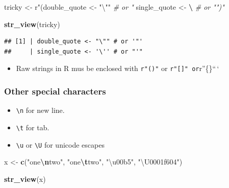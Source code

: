\documentclass[
]{article}
\newenvironment{Shaded}{\begin{snugshade}}{\end{snugshade}}
\newcommand{\CommentTok}[1]{\textcolor[rgb]{0.56,0.35,0.01}{\textit{#1}}}
\newcommand{\FunctionTok}[1]{\textcolor[rgb]{0.13,0.29,0.53}{\textbf{#1}}}
\newcommand{\NormalTok}[1]{#1}
\newcommand{\OtherTok}[1]{\textcolor[rgb]{0.56,0.35,0.01}{#1}}
\newcommand{\SpecialCharTok}[1]{\textcolor[rgb]{0.81,0.36,0.00}{\textbf{#1}}}
\newcommand{\StringTok}[1]{\textcolor[rgb]{0.31,0.60,0.02}{#1}}
\providecommand{\tightlist}{%
  \setlength{\itemsep}{0pt}\setlength{\parskip}{0pt}}
\begin{document}
\begin{Shaded}
\begin{Highlighting}[]
\NormalTok{tricky }\OtherTok{\textless{}{-}}\NormalTok{ r}\StringTok{"(double\_quote \textless{}{-} "}\NormalTok{\textbackslash{}}\StringTok{""} \CommentTok{\# or \textquotesingle{}"\textquotesingle{}}
\NormalTok{single\_quote }\OtherTok{\textless{}{-}} \StringTok{\textquotesingle{}}\SpecialCharTok{\textbackslash{}\textquotesingle{}}\StringTok{\textquotesingle{}} \CommentTok{\# or "\textquotesingle{}")"}

\FunctionTok{str\_view}\NormalTok{(tricky)}
\end{Highlighting}
\end{Shaded}

\begin{verbatim}
## [1] | double_quote <- "\"" # or '"'
##     | single_quote <- '\'' # or "'"
\end{verbatim}

\begin{itemize}
\tightlist
\item
  Raw strings in R mus be enclosed with \texttt{r"()"} or
  \texttt{r"{[}{]}"\textasciigrave{}\textasciigrave{}\ or}r''\{\}``\,`
\end{itemize}

\subsubsection{Other special characters}\label{other-special-characters}

\begin{itemize}
\tightlist
\item
  \texttt{\textbackslash{}n} for new line.\\
\item
  \texttt{\textbackslash{}t} for tab.
\item
  \texttt{\textbackslash{}u} or \texttt{\textbackslash{}U} for unicode
  escapes
\end{itemize}

\begin{Shaded}
\begin{Highlighting}[]
\NormalTok{x }\OtherTok{\textless{}{-}} \FunctionTok{c}\NormalTok{(}\StringTok{"one}\SpecialCharTok{\textbackslash{}n}\StringTok{two"}\NormalTok{, }\StringTok{"one}\SpecialCharTok{\textbackslash{}t}\StringTok{two"}\NormalTok{, }\StringTok{"\textbackslash{}u00b5"}\NormalTok{, }\StringTok{"\textbackslash{}U0001f604"}\NormalTok{)}

\FunctionTok{str\_view}\NormalTok{(x)}
\end{Highlighting}
\end{Shaded}
\end{document}
